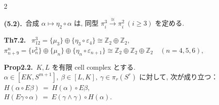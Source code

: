 \documentclass[10pt, leqno]{ltjsarticle}
\newcommand{\gen}[1]{\{#1\}}       %
\newcommand{\pit}[2]{\pi_{#1}^{#2}}
\numberwithin{equation}{section}
\theoremstyle{plain}
\theoremstyle{definition}
\theoremstyle{remark}
\begin{document}
\begin{paracol}{2}
\switchcolumn

\noindent
\textbf{(5.2).}\
\(\text{合成 } \alpha\longmapsto \eta_2\circ \alpha \text{ は, 同型 } 
\pi^{3}_{i}\xrightarrow{\cong}\pi^{2}_{i}\ (i\ge3) 
\text{ を定める. }\)

\noindent
\textbf{Th7.2.}\
\(\pit{12}{3}=\gen{\mu_{3}}\oplus\gen{\eta_{3}\circ\varepsilon_{4}}\cong\mathbb Z_{2}\oplus\mathbb Z_{2},\)\\
\(\pit{n+9}{n}=\gen{\nu_{n}^{3}}\oplus\gen{\mu_{n}}\oplus\gen{\eta_{n}\circ\varepsilon_{n+1}}
\cong\mathbb Z_{2}\oplus\mathbb Z_{2}\oplus\mathbb Z_{2}\quad (n=4,5,6),\)

\noindent
\textbf{Prop2.2.}\
$K,L$ を有限 cell complex とする. \\
$\alpha\in[EK, S^{m+1}], \ \beta\in[L,K], \ \gamma\in\pi_r(S^r)$ 
に対して, 次が成り立つ：\\
\(
H(\alpha\circ E\beta)\ =\ H(\alpha)\circ E\beta,
\)\\
\(
H(E\gamma\circ\alpha)\ =\ E(\gamma\wedge\gamma)\circ H(\alpha).
\)


\end{paracol}
\end{document}
